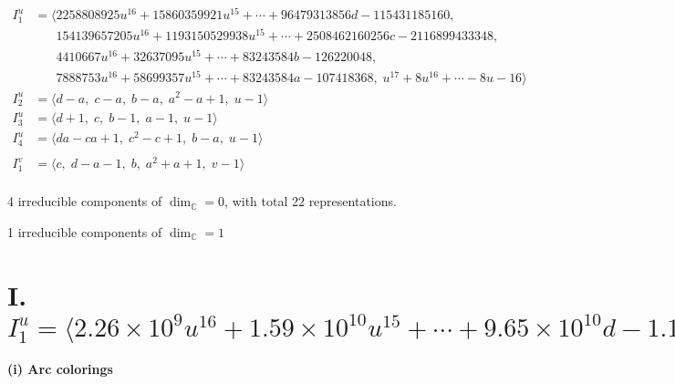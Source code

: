 \documentclass[1p]{elsarticle_modified}
\theoremstyle{definition}
\begin{document}
\begin{align*}
I^u_{1}&=\langle 
2258808925 u^{16}+15860359921 u^{15}+\cdots+96479313856 d-115431185160,\\
\phantom{I^u_{1}}&\phantom{= \langle  }154139657205 u^{16}+1193150529938 u^{15}+\cdots+2508462160256 c-2116899433348,\\
\phantom{I^u_{1}}&\phantom{= \langle  }4410667 u^{16}+32637095 u^{15}+\cdots+83243584 b-126220048,\\
\phantom{I^u_{1}}&\phantom{= \langle  }7888753 u^{16}+58699357 u^{15}+\cdots+83243584 a-107418368,\;u^{17}+8 u^{16}+\cdots-8 u-16\rangle \\
I^u_{2}&=\langle 
d- a,\;c- a,\;b- a,\;a^2- a+1,\;u-1\rangle \\
I^u_{3}&=\langle 
d+1,\;c,\;b-1,\;a-1,\;u-1\rangle \\
I^u_{4}&=\langle 
d a- c a+1,\;c^2- c+1,\;b- a,\;u-1\rangle \\
\\
I^v_{1}&=\langle 
c,\;d- a-1,\;b,\;a^2+a+1,\;v-1\rangle \\
\end{align*}
\raggedright * 4 irreducible components of $\dim_{\mathbb{C}}=0$, with total 22 representations.\\
\raggedright * 1 irreducible components of $\dim_{\mathbb{C}}=1$ \\
\newpage
\renewcommand{\arraystretch}{1}
\centering \section*{I. $I^u_{1}= \langle 2.26\times10^{9} u^{16}+1.59\times10^{10} u^{15}+\cdots+9.65\times10^{10} d-1.15\times10^{11},\;1.54\times10^{11} u^{16}+1.19\times10^{12} u^{15}+\cdots+2.51\times10^{12} c-2.12\times10^{12},\;4.41\times10^{6} u^{16}+3.26\times10^{7} u^{15}+\cdots+8.32\times10^{7} b-1.26\times10^{8},\;7.89\times10^{6} u^{16}+5.87\times10^{7} u^{15}+\cdots+8.32\times10^{7} a-1.07\times10^{8},\;u^{17}+8 u^{16}+\cdots-8 u-16 \rangle$}
\flushleft \textbf{(i) Arc colorings}\\
\end{document}
